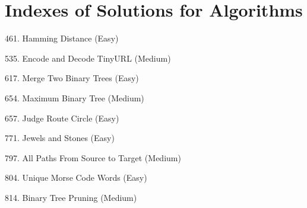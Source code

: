 \tocless\section{Indexes of Solutions for Algorithms}
\label{sec:algo_ind}

\begin{flushleft}
461. Hamming Distance (Easy)\hfill\pageref{algo:461}

535. Encode and Decode TinyURL (Medium)\hfill\pageref{algo:535}

617. Merge Two Binary Trees (Easy)\hfill\pageref{algo:617}

654. Maximum Binary Tree (Medium)\hfill\pageref{algo:654}

657. Judge Route Circle (Easy)\hfill\pageref{algo:657}

771. Jewels and Stones (Easy)\hfill\pageref{algo:771}

797. All Paths From Source to Target (Medium)\hfill\pageref{algo:797}

804. Unique Morse Code Words (Easy)\hfill\pageref{algo:804}

814. Binary Tree Pruning (Medium)\hfill\pageref{algo:814}
\end{flushleft}

\newpage
